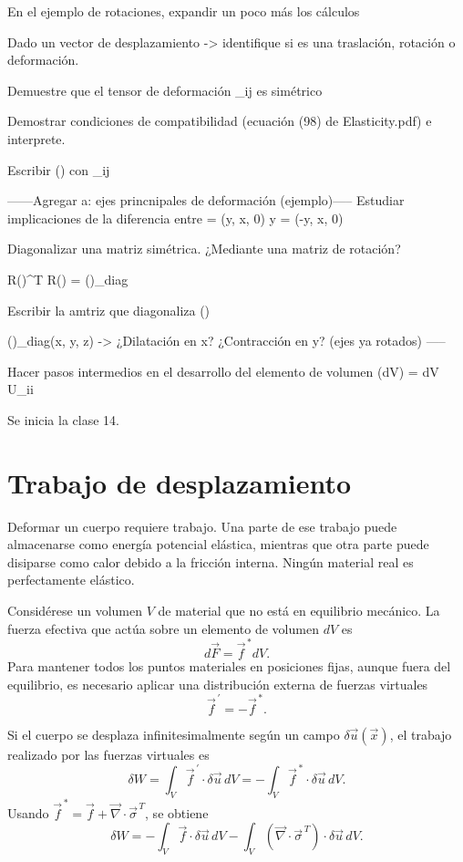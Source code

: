 En el ejemplo de rotaciones, expandir un poco más los cálculos

Dado un vector de desplazamiento -> identifique si es una traslación, rotación o deformación.

Demuestre que el tensor de deformación _{ij} es simétrico

Demostrar condiciones de compatibilidad (ecuación (98) de Elasticity.pdf) e interprete.

Escribir \delta(\cdot{}) con \sum_{ij}

------Agregar a: ejes princnipales de deformación (ejemplo)-----
Estudiar implicaciones de la diferencia entre  = \alpha(y, x, 0) y  = \theta(-y, x, 0)

Diagonalizar una matriz simétrica. ¿Mediante una matriz de rotación?

R(\bete)^T \nabla{}R(\beta) = (\vec{\nabla})_{diag}

Escribir la amtriz que diagonaliza ()

(\vec{\nabla})_{diag}(x, y, z) -> ¿Dilatación en x? ¿Contracción en y? (ejes ya rotados)
-----

Hacer pasos intermedios en el desarrollo del elemento de volumen \delta(dV) = dV U_{ii}

Se inicia la clase 14.
\iffalse
\section{Trabajo de desplazamiento}

Deformar un cuerpo requiere trabajo. Una parte de ese trabajo puede almacenarse como energía potencial elástica, mientras que otra parte puede disiparse como calor debido a la fricción interna. Ningún material real es perfectamente elástico.

Considérese un volumen $V$ de material que no está en equilibrio mecánico. La fuerza efectiva que actúa sobre un elemento de volumen $dV$ es
$$ d\vec{F} = \vec{f}^{\,*} dV. $$
Para mantener todos los puntos materiales en posiciones fijas, aunque fuera del equilibrio, es necesario aplicar una distribución externa de fuerzas virtuales
$$ \vec{f}^{\,\prime} = -\vec{f}^{\,*}. $$

Si el cuerpo se desplaza infinitesimalmente según un campo $\delta\vec{u}(\vec{x})$, el trabajo realizado por las fuerzas virtuales es
$$ \delta W = \int_V \vec{f}^{\,\prime}\cdot \delta\vec{u}\,dV = -\int_V \vec{f}^{\,*}\cdot\delta\vec{u}\,dV. $$
Usando $\vec{f}^{\,*} = \vec{f} + \vec{\nabla}\cdot\vec{\sigma}^{\,T}$, se obtiene
$$ \delta W = -\int_V \vec{f}\cdot\delta\vec{u}\,dV - \int_V \left(\vec{\nabla}\cdot\vec{\sigma}^{\,T}\right)\cdot\delta\vec{u}\,dV. $$

